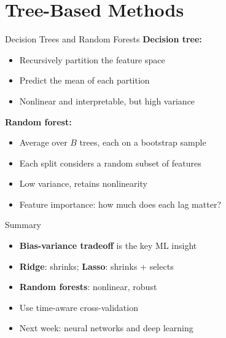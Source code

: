 \documentclass[aspectratio=169, 10pt]{beamer}
\begin{document}
\section{Tree-Based Methods}

\begin{frame}{Decision Trees and Random Forests}
\textbf{Decision tree:}
\begin{itemize}
    \item Recursively partition the feature space
    \item Predict the mean of each partition
    \item \alert{Nonlinear} and interpretable, but high variance
\end{itemize}

\vspace{0.5em}
\textbf{Random forest:}
\begin{itemize}
    \item Average over $B$ trees, each on a bootstrap sample
    \item Each split considers a random subset of features
    \item \alert{Low variance}, retains nonlinearity
    \item Feature importance: how much does each lag matter?
\end{itemize}
\end{frame}

\begin{frame}{Summary}
\begin{itemize}
    \item \textbf{Bias-variance tradeoff} is the key ML insight
    \item \textbf{Ridge}: shrinks; \textbf{Lasso}: shrinks + selects
    \item \textbf{Random forests}: nonlinear, robust
    \item Use \alert{time-aware cross-validation}
    \item Next week: \alert{neural networks and deep learning}
\end{itemize}
\end{frame}
\end{document}
